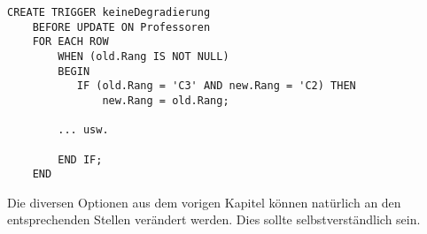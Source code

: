 \begin{lstlisting}[caption={Trigger Beispiel SQL}]
    CREATE TRIGGER keineDegradierung
    BEFORE UPDATE ON Professoren
    FOR EACH ROW
        WHEN (old.Rang IS NOT NULL)
        BEGIN
           IF (old.Rang = 'C3' AND new.Rang = 'C2) THEN
               new.Rang = old.Rang;
               
        ... usw.
        
        END IF;
    END
\end{lstlisting}

Die diversen Optionen aus dem vorigen Kapitel können natürlich an den entsprechenden Stellen verändert werden. Dies sollte selbstverständlich sein.
